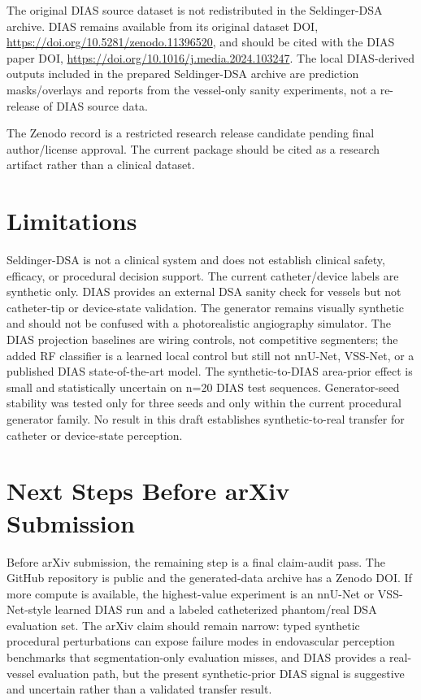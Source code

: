 \documentclass[10pt]{article}
\begin{document}
The original DIAS source dataset is not redistributed in the Seldinger-DSA archive. DIAS remains available from its original dataset DOI, \url{https://doi.org/10.5281/zenodo.11396520}, and should be cited with the DIAS paper DOI, \url{https://doi.org/10.1016/j.media.2024.103247}. The local DIAS-derived outputs included in the prepared Seldinger-DSA archive are prediction masks/overlays and reports from the vessel-only sanity experiments, not a re-release of DIAS source data.

The Zenodo record is a restricted research release candidate pending final author/license approval. The current package should be cited as a research artifact rather than a clinical dataset.

\section{Limitations}
Seldinger-DSA is not a clinical system and does not establish clinical safety, efficacy, or procedural decision support. The current catheter/device labels are synthetic only. DIAS provides an external DSA sanity check for vessels but not catheter-tip or device-state validation. The generator remains visually synthetic and should not be confused with a photorealistic angiography simulator. The DIAS projection baselines are wiring controls, not competitive segmenters; the added RF classifier is a learned local control but still not nnU-Net, VSS-Net, or a published DIAS state-of-the-art model. The synthetic-to-DIAS area-prior effect is small and statistically uncertain on n=20 DIAS test sequences. Generator-seed stability was tested only for three seeds and only within the current procedural generator family. No result in this draft establishes synthetic-to-real transfer for catheter or device-state perception.

\section{Next Steps Before arXiv Submission}
Before arXiv submission, the remaining step is a final claim-audit pass. The GitHub repository is public and the generated-data archive has a Zenodo DOI. If more compute is available, the highest-value experiment is an nnU-Net or VSS-Net-style learned DIAS run and a labeled catheterized phantom/real DSA evaluation set. The arXiv claim should remain narrow: typed synthetic procedural perturbations can expose failure modes in endovascular perception benchmarks that segmentation-only evaluation misses, and DIAS provides a real-vessel evaluation path, but the present synthetic-prior DIAS signal is suggestive and uncertain rather than a validated transfer result.



\end{document}
